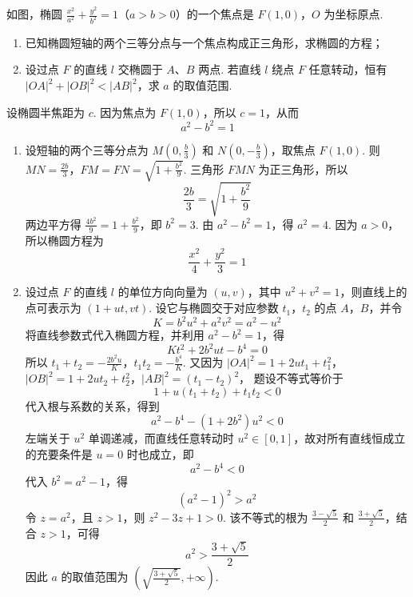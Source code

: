 \begin{problem}
如图，椭圆 \(\frac{x^2}{a^2} + \frac{y^2}{b^2} = 1\)（\(a > b > 0\)）的一个焦点是 \(F(1,0)\)，\(O\) 为坐标原点.

\begin{enumerate}
\item 已知椭圆短轴的两个三等分点与一个焦点构成正三角形，求椭圆的方程；
\item 设过点 \(F\) 的直线 \(l\) 交椭圆于 \(A\)、\(B\) 两点. 若直线 \(l\) 绕点 \(F\) 任意转动，恒有 \(|OA|^2 + |OB|^2 < |AB|^2\)，求 \(a\) 的取值范围.
\end{enumerate}

\end{problem}

\begin{solution}
设椭圆半焦距为 \(c\). 因为焦点为 \(F(1,0)\)，所以 \(c=1\)，从而
\[
a^2-b^2=1
\]
\begin{enumerate}
\item 设短轴的两个三等分点为 \(M\left(0,\frac{b}{3}\right)\) 和 \(N\left(0,-\frac{b}{3}\right)\)，取焦点 \(F(1,0)\). 则 \(MN=\frac{2b}{3}\)，\(FM=FN=\sqrt{1+\frac{b^2}{9}}\).
三角形 \(FMN\) 为正三角形，所以
\[
\frac{2b}{3}=\sqrt{1+\frac{b^2}{9}}
\]
两边平方得 \(\frac{4b^2}{9}=1+\frac{b^2}{9}\)，即 \(b^2=3\). 由 \(a^2-b^2=1\)，得 \(a^2=4\). 因为 \(a>0\)，所以椭圆方程为
\[
\frac{x^2}{4}+\frac{y^2}{3}=1
\]

\item 设过点 \(F\) 的直线 \(l\) 的单位方向向量为 \((u,v)\)，其中 \(u^2+v^2=1\)，则直线上的点可表示为 \((1+ut,vt)\). 设它与椭圆交于对应参数 \(t_1\)，\(t_2\) 的点 \(A\)，\(B\)，并令
\[
K=b^2u^2+a^2v^2=a^2-u^2
\]
将直线参数式代入椭圆方程，并利用 \(a^2-b^2=1\)，得
\[
Kt^2+2b^2ut-b^4=0
\]
所以 \(t_1+t_2=-\frac{2b^2u}{K}\)，\(t_1t_2=-\frac{b^4}{K}\).
又因为 \(|OA|^2=1+2ut_1+t_1^2\)，\(|OB|^2=1+2ut_2+t_2^2\)，\(|AB|^2=(t_1-t_2)^2\)，
题设不等式等价于
\[
1+u(t_1+t_2)+t_1t_2<0
\]
代入根与系数的关系，得到
\[
a^2-b^4-(1+2b^2)u^2<0
\]
左端关于 \(u^2\) 单调递减，而直线任意转动时 \(u^2\in[0,1]\)，故对所有直线恒成立的充要条件是 \(u=0\) 时也成立，即
\[
a^2-b^4<0
\]
代入 \(b^2=a^2-1\)，得
\[
(a^2-1)^2>a^2
\]
令 \(z=a^2\)，且 \(z>1\)，则 \(z^2-3z+1>0\). 该不等式的根为 \(\frac{3-\sqrt{5}}{2}\) 和 \(\frac{3+\sqrt{5}}{2}\)，结合 \(z>1\)，可得
\[
a^2>\frac{3+\sqrt{5}}{2}
\]
因此 \(a\) 的取值范围为 \(\left(\sqrt{\frac{3+\sqrt{5}}{2}},+\infty\right)\).
\end{enumerate}
\end{solution}

